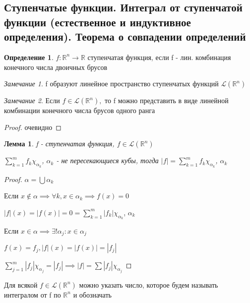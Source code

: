 \documentclass[a4paper]{article}
\newtheorem{lemma}{Лемма}[section]
\theoremstyle{definition}
\newtheorem*{definition}{Определение}
\theoremstyle{remark}
\newtheorem*{remark}{Замечание}
\begin{document}
    \subsection{ Ступенчатые функции. Интеграл от ступенчатой функции (естественное и индуктивное определения). Теорема о совпадении определений}
    \begin{definition}
     $f:\mathbb{R} ^n \to \mathbb{R} $ ступенчатая функция, если f - лин. комбинация конечного числа двоичных брусов
\end{definition}
\begin{remark}
     f образуют линейное пространство ступенчатых функций $\mathcal{L}(\mathbb{R} ^n) $

\end{remark}
\begin{remark}
     Если $f\in \mathcal{L}(\mathbb{R} ^n),$ то f можно представить в виде 
     линейной комбинации конечного числа брусов одного ранга
\end{remark}
\begin{proof}
     очевидно
\end{proof}
\begin{lemma}
     f - ступенчатая функция, $f\in \mathcal{L}(\mathbb{R} ^n)$

     $\sum_{k=1}^m f_k \chi_{\alpha_k}$, $\alpha_k$ -  не пересекающиеся кубы, тогда $|f| = \sum_{k=1}^m f_k \chi_{\alpha_k}$, $\alpha_k$
\end{lemma}
\begin{proof}
     $\alpha = \bigcup\alpha_k$

     Если $x\notin\alpha\implies\forall k, x\in\alpha_k\implies f(x) = 0$

     $|f|(x) = |f(x)| = 0 = \sum_{k=1}^m |f_k |\chi_{\alpha_k}$, $\alpha_k$

     Если $x\in \alpha\implies\exists!\alpha_j : x\in \alpha_j$

     $f(x) = f_j, |f|(x) = |f(x)| = |f_j|$

     $\sum_{j=1}^m |f_j |\chi_{\alpha_j} = |f_j|\implies |f| = \sum |f_j |\chi_{\alpha_j}$
\end{proof}
Для всякой $f\in \mathcal{L}(\mathbb{R} ^n)$ можно указать число, которое будем называть
интегралом от f по $\mathbb{R} ^n$ и обозначать
\end{document}
